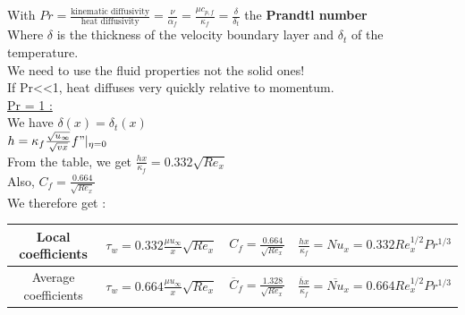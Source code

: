 \documentclass[../main.tex]{subfiles}
\begin{document}
With $Pr = \frac{\text{kinematic diffusivity}}{\text{heat diffusivity}} = \frac{\nu}{\alpha_f} = \frac{\mu c_{p,f}}{\kappa_f} = \frac{\delta}{\delta_t}$ the \textbf{Prandtl number}\\
Where $\delta$ is the thickness of the velocity boundary layer and $\delta_t$ of the temperature.\\
\warning We need to use the fluid properties not the solid ones!\\

If Pr<<1, heat diffuses very quickly relative to momentum.\\

\quad \underline{Pr = 1 :}\\
We have $\delta(x) = \delta_t(x)$\\
$h = \kappa_f \frac{\sqrt{u_\infty}}{\sqrt{vx}} f"\lvert_{\eta=0}$\\

From the table, we get $\frac{hx}{\kappa_f} = 0.332 \sqrt{Re_x}$\\

Also, $C_f = \frac{0.664}{\sqrt{Re_x}}$\\

We therefore get : \begin{table}[hbt!]
    \centering
    \begin{tabular}{c|c|c|c}
    Local coefficients & $\tau_w = 0.332 \frac{\mu u_\infty}{x} \sqrt{Re_x}$ & $C_f = \frac{0.664}{\sqrt{Re_x}}$ & $\frac{hx}{\kappa_f} = Nu_x = 0.332 Re_x^{1/2} Pr^{1/3}$\\
    \hline
     Average coefficients & $\tau_w = 0.664 \frac{\mu u_\infty}{x}\sqrt{Re_x}$ & $\overline{C}_f = \frac{1.328}{\sqrt{Re_x}}$ & $\frac{\overline{h}x}{\kappa_f} = \overline{Nu}_x = 0.664 Re_x^{1/2} Pr^{1/3}$  \\
    \end{tabular}
\end{table}
\end{document}
